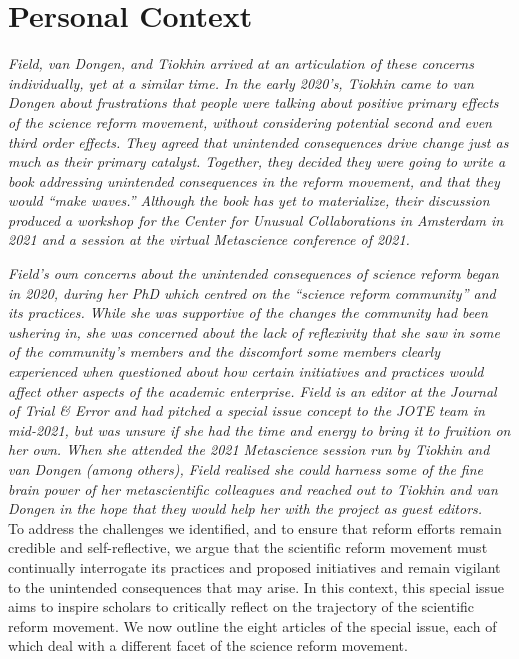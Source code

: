 \documentclass[authordate, editorial,noabstract]{jote-new-article}
\begin{document}
\section{Personal Context}



\emph{Field, van Dongen, and Tiokhin arrived at an articulation of these concerns individually, yet at a similar time. In the early 2020's, Tiokhin came to van Dongen about frustrations that people were talking about positive primary effects of the science reform movement, without considering potential second and even third order effects. They agreed that unintended consequences drive change just as much as their primary catalyst. Together, they decided they were going to write a book addressing unintended consequences in the reform movement, and that they would “make waves.” Although the book has yet to materialize, their discussion produced a workshop for the Center for Unusual Collaborations in Amsterdam in 2021 and a session at the virtual Metascience conference of 2021. }



\emph{Field's own concerns about the unintended consequences of science reform began in 2020, during her PhD which centred on the “science reform community” and its practices. While she was supportive of the changes the community had been ushering in, she was concerned about the lack of reflexivity that she saw in some of the community's members and the discomfort some members clearly experienced when questioned about how certain initiatives and practices would affect other aspects of the academic enterprise. Field is an editor at the Journal of Trial \& Error and had pitched a special issue concept to the JOTE team in mid-2021, but was unsure if she had the time and energy to bring it to fruition on her own. When she attended the 2021 Metascience session run by Tiokhin and van Dongen (among others), Field realised she could harness some of the fine brain power of her metascientific colleagues and reached out to Tiokhin and van Dongen in the hope that they would help her with the project as guest editors. }\\







To address the challenges we identified, and to ensure that reform efforts remain credible and self-reflective, we argue that the scientific reform movement must continually interrogate its practices and proposed initiatives and remain vigilant to the unintended consequences that may arise. In this context, this special issue aims to inspire scholars to critically reflect on the trajectory of the scientific reform movement. We now outline the eight articles of the special issue, each of which deal with a different facet of the science reform movement.
\end{document}
